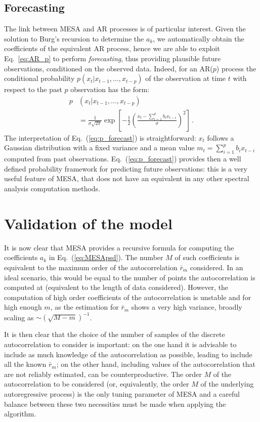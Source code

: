 \documentclass[twocolumn,showpacs,preprintnumbers,nofootinbib,prd,
superscriptaddress,10pt]{revtex4-1}
\begin{document}
\subsection{Forecasting} \label{sec:forecasting}
The link between MESA and AR processes is of particular interest. Given the solution to Burg's recursion to determine the $a_k$, we automatically obtain the coefficients of the equivalent AR process, hence we are able to exploit Eq.~\ref{eq:AR_p} to perform \emph{forecasting}, thus providing plausible future observations, conditioned on the observed data.
Indeed, for an AR($p$) process the conditional probability $p(x_t|x_{t-1}, \ldots , x_{t-p})$ of the observation at time $t$ with respect to the past $p$ observation has the form:
\begin{align}\label{eq:p_forecast}
	p&(x_t|x_{t-1}, \ldots , x_{t-p}) \nonumber\\
	&= \frac{1}{\sigma\sqrt{2\pi}} \exp\left[-\frac{1}{2} \left(\frac{x_t - \sum_{i = 1}^p b_i x_{t-i}}{\sigma}\right)^2\right]\,.
\end{align}
The interpretation of Eq.~(\ref{eq:p_forecast}) is straightforward: $x_t$ follows a Gaussian distribution with a fixed variance and a mean value $m_t = \sum_{i = 1}^p b_i x_{t-i}$ computed from past observations.
Eq.~(\ref{eq:p_forecast}) provides then a well defined probability framework for predicting future observations: this is a very useful feature of MESA, that does not have an equivalent in any other spectral analysis computation methods.

\section{Validation of the model}\label{sec:validation}
It is now clear that MESA provides a recursive formula for computing the coefficients $a_k$ in Eq.~(\ref{eq:MESApsd}). The number $M$ of such coefficients is
equivalent to the maximum order of the autocorrelation $\bar{r}_m$ considered. In an ideal scenario, this would be equal to the number of points the autocorrelation is computed at (equivalent to the length of data considered). However, the computation of high order coefficients of the autocorrelation is unstable and for high enough $m$, as the estimation for  $\bar{r}_m$ shows a very high variance, broadly scaling as $\sim \left(\sqrt{M - m}\right)^{-1}$.

It is then clear that the choice of the number of samples of the discrete autocorrelation to consider is important: 
on the one hand it is advisable to include as much knowledge of the autocorrelation as possible, leading to include all the known $\bar{r}_m$; on the other hand, including values of the autocorrelation that are not reliably estimated, can be counterproductive.
The order $M$ of the autocorrelation to be considered (or, equivalently, the order $M$ of the underlying autoregressive process) is the only tuning parameter of MESA and a careful balance between these two necessities must be made when applying the algorithm.
\end{document}
